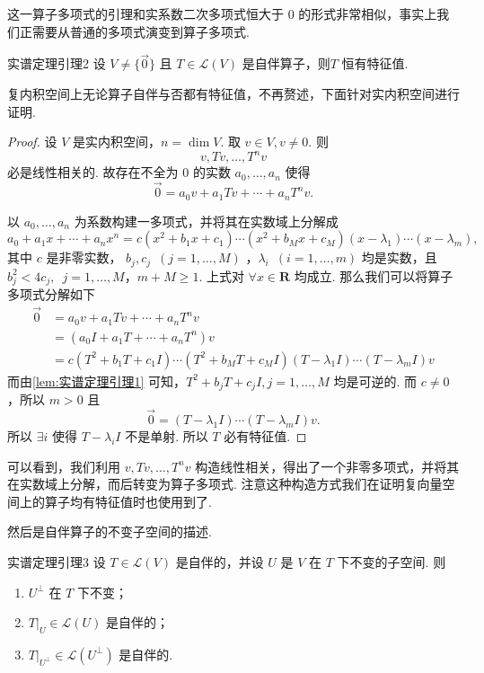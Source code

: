 这一算子多项式的引理和实系数二次多项式恒大于 0 的形式非常相似，事实上我们正需要从普通的多项式演变到算子多项式.

\begin{lemma}{}{实谱定理引理2}
    设 $ V \neq \{ \vec{0} \} $ 且 $ T \in \mathcal{L}(V) $ 是自伴算子，则$ T $ 恒有特征值.
\end{lemma}

复内积空间上无论算子自伴与否都有特征值，不再赘述，下面针对实内积空间进行证明.

\begin{proof}
    设 $ V $ 是实内积空间，$ n = \dim V $. 取 $ v \in V, v \neq 0 $. 则
    \[ v, Tv, \ldots , T^nv \]
    必是线性相关的. 故存在不全为 0 的实数 $ a_0, \ldots , a_n $ 使得
    \[ \vec{0} = a_0v + a_1Tv + \cdots + a_nT^nv. \]

    以 $ a_0, \ldots , a_n $ 为系数构建一多项式，并将其在实数域上分解成
    \[ a_0 + a_1x + \cdots + a_nx^n  = c(x^2 + b_1x + c_1)\cdots(x^2 + b_Mx + c_M)(x - \lambda_1)\cdots(x - \lambda_m), \]
    其中 $ c $ 是非零实数， $ b_j, c_j \enspace(j = 1, \ldots , M) $ ，$ \lambda_i \enspace(i = 1, \ldots , m) $ 均是实数，且 $ b_j^2 < 4c_j ,\enspace j = 1, \ldots , M $，$ m + M \geqslant 1 $. 上式对 $ \forall x \in \mathbf{R} $ 均成立. 那么我们可以将算子多项式分解如下
    \begin{align*}
        \vec{0} & = a_0v + a_1Tv + \cdots + a_nT^nv                                                      \\
                & = (a_0I + a_1T + \cdots + a_nT^n)v                                                     \\
                & = c(T^2 + b_1T + c_1I)\cdots(T^2 + b_MT + c_MI)(T - \lambda_1I)\cdots(T - \lambda_mI)v
    \end{align*}
    而由\autoref{lem:实谱定理引理1} 可知，$ T^2 + b_jT + c_jI, j = 1, \ldots , M $ 均是可逆的. 而 $ c \neq 0 $，所以 $ m > 0 $ 且
    \[ \vec{0} = (T - \lambda_1I)\cdots(T - \lambda_mI)v. \]
    所以 $ \exists i $ 使得 $ T - \lambda_iI $ 不是单射. 所以 $ T $ 必有特征值.
\end{proof}

可以看到，我们利用 $ v, Tv, \ldots , T^nv $ 构造线性相关，得出了一个非零多项式，并将其在实数域上分解，而后转变为算子多项式. 注意这种构造方式我们在证明复向量空间上的算子均有特征值时也使用到了.

然后是自伴算子的不变子空间的描述.

\begin{lemma}{}{实谱定理引理3}
    设 $ T \in \mathcal{L}(V) $ 是自伴的，并设 $ U $ 是 $ V $ 在 $ T $ 下不变的子空间. 则
    \begin{enumerate}
        \item $ U^{\perp} $ 在 $ T $ 下不变；

        \item $ T|_U \in \mathcal{L}(U) $ 是自伴的；

        \item $ T|_{U^{\perp }} \in \mathcal{L}(U^{\perp }) $ 是自伴的.
    \end{enumerate}
\end{lemma}

